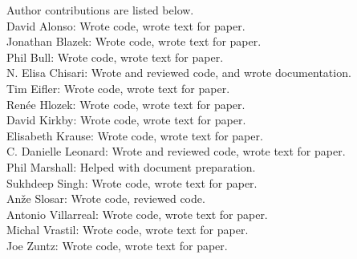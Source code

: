 Author contributions are listed below. \\
David Alonso: Wrote code, wrote text for paper. \\
Jonathan Blazek: Wrote code, wrote text for paper. \\
Phil Bull: Wrote code, wrote text for paper. \\
N. Elisa Chisari: Wrote and reviewed code, and wrote documentation.\\
Tim Eifler: Wrote code, wrote text for paper. \\
Ren\'ee Hlozek: Wrote code, wrote text for paper. \\
David Kirkby: Wrote code, wrote text for paper. \\
Elisabeth Krause: Wrote code, wrote text for paper. \\
C. Danielle Leonard: Wrote and reviewed code, wrote text for paper. \\
Phil Marshall: Helped with document preparation. \\
Sukhdeep Singh: Wrote code, wrote text for paper. \\
An\v{z}e Slosar: Wrote code, reviewed code. \\
Antonio Villarreal: Wrote code, wrote text for paper. \\
Michal Vrastil: Wrote code, wrote text for paper. \\
Joe Zuntz: Wrote code, wrote text for paper. \\
